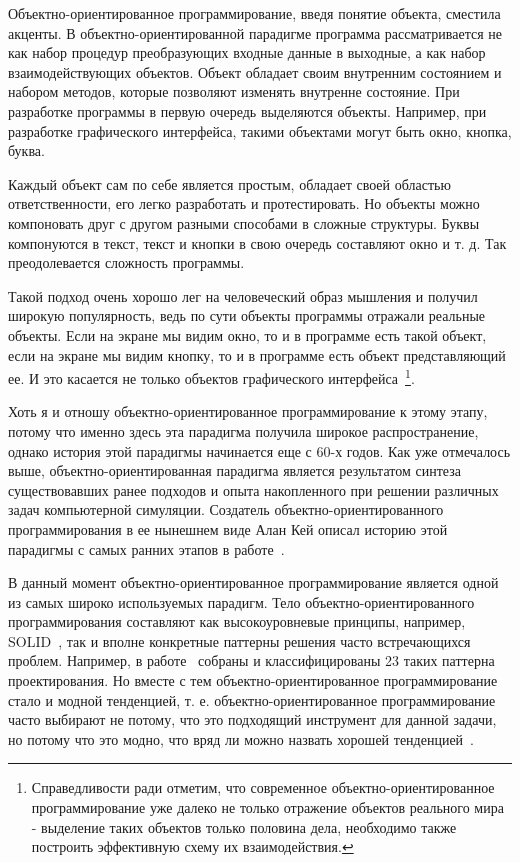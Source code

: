 Объектно-ориентированное программирование, введя понятие объекта, сместила акценты. В объектно-ориентированной парадигме программа рассматривается не как набор процедур преобразующих входные данные в выходные, а как набор взаимодействующих объектов. Объект обладает своим внутренним состоянием и набором методов, которые позволяют изменять внутренне состояние. При разработке программы в первую очередь выделяются объекты. Например, при разработке графического интерфейса, такими объектами могут быть окно, кнопка, буква.

Каждый объект сам по себе является простым, обладает своей областью ответственности, его легко разработать и протестировать. Но объекты можно компоновать друг с другом разными способами в сложные структуры. Буквы компонуются в текст, текст и кнопки в свою очередь составляют окно и т. д. Так преодолевается сложность программы.

Такой подход очень хорошо лег на человеческий образ мышления и получил широкую популярность, ведь по сути объекты программы отражали реальные объекты. Если на экране мы видим окно, то и в программе есть такой объект, если на экране мы видим кнопку, то и в программе есть объект представляющий ее. И это касается не только объектов графического интерфейса~\footnote{Справедливости ради отметим, что современное объектно-ориентированное программирование уже далеко не только отражение объектов реального мира - выделение таких объектов только половина дела, необходимо также построить эффективную схему их взаимодействия.}.

Хоть я и отношу объектно-ориентированное программирование к этому этапу, потому что именно здесь эта парадигма получила широкое распространение, однако история этой парадигмы начинается еще с 60-х годов. Как уже отмечалось выше, объектно-ориентированная парадигма является результатом синтеза существовавших ранее подходов и опыта накопленного при решении различных задач компьютерной симуляции. Создатель объектно-ориентированного программирования в ее нынешнем виде Алан Кей описал историю этой парадигмы с самых ранних этапов в работе~\cite{Kay:1996:EHS}.

В данный момент объектно-ориентированное программирование является одной из самых широко используемых парадигм. Тело объектно-ориентированного программирования составляют как высокоуровневые принципы, например, SOLID~\cite{SOLID}, так и вполне конкретные паттерны решения часто встречающихся проблем. Например, в работе~\cite{Gamma:1995:DPE} собраны и классифицированы 23 таких паттерна проектирования. Но вместе с тем объектно-ориентированное программирование стало и модной тенденцией, т. е. объектно-ориентированное программирование часто выбирают не потому, что это подходящий инструмент для данной задачи, но потому что это модно, что вряд ли можно назвать хорошей тенденцией~\cite{Wirth:2008:HIST}.

